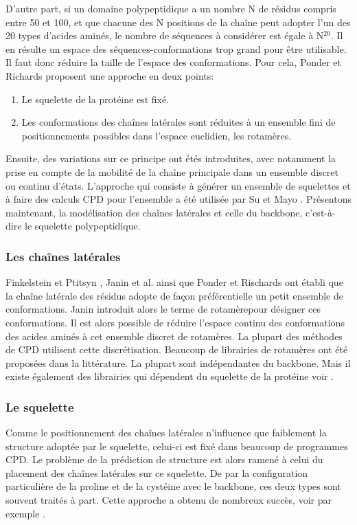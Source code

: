 D'autre part, si un domaine polypeptidique a un nombre N de résidus compris entre 50 et 100, et que chacune des N positions de la chaîne peut adopter l'un des 20 types d'acides aminés, le nombre de séquences à considérer est égale à  N$^{20}$. Il en résulte un espace des séquences-conformations trop grand pour être utilisable. Il faut donc réduire la taille de l'espace des conformations. Pour cela, Ponder et Richards \cite{Ponder87} proposent une approche en deux points:
\begin{enumerate}[leftmargin=*]
\item Le squelette de la protéine est fixé.
\item Les conformations des chaînes latérales sont réduites à un ensemble fini de positionnements possibles dans l'espace euclidien, les \og rotamères\fg.
\end{enumerate}  
Ensuite, des variations sur ce principe ont étés introduites, avec notamment la prise en compte de la mobilité de la chaîne principale dans un ensemble discret ou continu d'états. L'approche qui consiste à générer un ensemble de squelettes et à faire des calculs CPD pour l'ensemble a été utilisée par Su et Mayo \cite{Su97}. 
Présentons maintenant, la modélisation des chaînes latérales et celle du backbone, c'est-à-dire le squelette polypeptidique.

\subsubsection{Les chaînes latérales}

Finkelstein et Ptitsyn \cite{Finkelstein77}, Janin et al. \cite{Janin78} ainsi que Ponder et Rischards \cite{Ponder87} ont établi que la chaîne latérale des résidus adopte de façon préférentielle un petit ensemble de conformations. Janin introduit alors le terme de \og rotamère\fg pour désigner ces conformations. Il est alors possible de réduire l'espace continu des conformations des acides aminés à cet ensemble discret de rotamères. La plupart des méthodes de CPD utilisent cette discrétisation. Beaucoup de librairies de rotamères ont été proposées dans la littérature. La plupart sont indépendantes du backbone. Mais il existe également des librairies qui dépendent du squelette de la protéine voir \cite{McGregor87,Dunbrack93}. 

\subsubsection{Le squelette}
Comme le positionnement des chaînes latérales n'influence que faiblement la structure adoptée par le squelette, celui-ci est fixé dans beaucoup de programmes CPD. Le problème de la prédiction de structure est alors ramené à celui du placement des chaînes latérales sur ce squelette. De par la configuration particulière de la proline et de la cystéine avec le backbone, ces deux types sont souvent traités à part. Cette approche a obtenu de nombreux succès, voir par exemple \cite{Dahiyat97b}.

